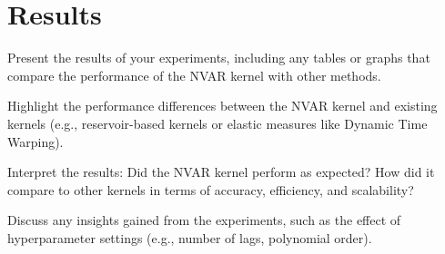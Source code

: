 \chapter{Results} \label{chap:res}

Present the results of your experiments, including any tables or graphs that compare the performance of the NVAR kernel with other methods.

Highlight the performance differences between the NVAR kernel and existing kernels (e.g., reservoir-based kernels or elastic measures like Dynamic Time Warping).

Interpret the results: Did the NVAR kernel perform as expected? How did it compare to other kernels in terms of accuracy, efficiency, and scalability?

Discuss any insights gained from the experiments, such as the effect of hyperparameter settings (e.g., number of lags, polynomial order).
